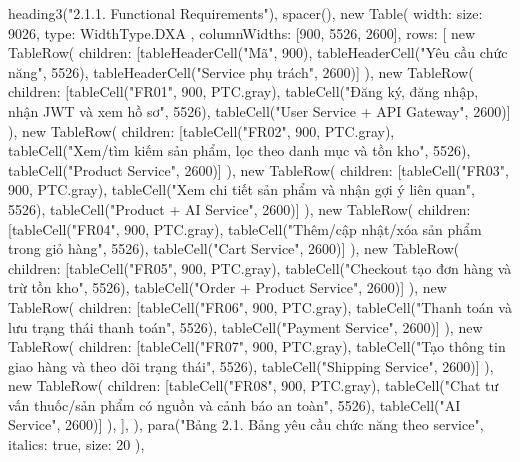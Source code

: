  heading3("2.1.1. Functional Requirements"),
  spacer(),
  new Table({
    width: { size: 9026, type: WidthType.DXA },
    columnWidths: [900, 5526, 2600],
    rows: [
      new TableRow({ children: [tableHeaderCell("Mã", 900), tableHeaderCell("Yêu cầu chức năng", 5526), tableHeaderCell("Service phụ trách", 2600)] }),
      new TableRow({ children: [tableCell("FR01", 900, PTC.gray), tableCell("Đăng ký, đăng nhập, nhận JWT và xem hồ sơ", 5526), tableCell("User Service + API Gateway", 2600)] }),
      new TableRow({ children: [tableCell("FR02", 900, PTC.gray), tableCell("Xem/tìm kiếm sản phẩm, lọc theo danh mục và tồn kho", 5526), tableCell("Product Service", 2600)] }),
      new TableRow({ children: [tableCell("FR03", 900, PTC.gray), tableCell("Xem chi tiết sản phẩm và nhận gợi ý liên quan", 5526), tableCell("Product + AI Service", 2600)] }),
      new TableRow({ children: [tableCell("FR04", 900, PTC.gray), tableCell("Thêm/cập nhật/xóa sản phẩm trong giỏ hàng", 5526), tableCell("Cart Service", 2600)] }),
      new TableRow({ children: [tableCell("FR05", 900, PTC.gray), tableCell("Checkout tạo đơn hàng và trừ tồn kho", 5526), tableCell("Order + Product Service", 2600)] }),
      new TableRow({ children: [tableCell("FR06", 900, PTC.gray), tableCell("Thanh toán và lưu trạng thái thanh toán", 5526), tableCell("Payment Service", 2600)] }),
      new TableRow({ children: [tableCell("FR07", 900, PTC.gray), tableCell("Tạo thông tin giao hàng và theo dõi trạng thái", 5526), tableCell("Shipping Service", 2600)] }),
      new TableRow({ children: [tableCell("FR08", 900, PTC.gray), tableCell("Chat tư vấn thuốc/sản phẩm có nguồn và cảnh báo an toàn", 5526), tableCell("AI Service", 2600)] }),
    ],
  }),
  para("Bảng 2.1. Bảng yêu cầu chức năng theo service", { italics: true, size: 20 }),

